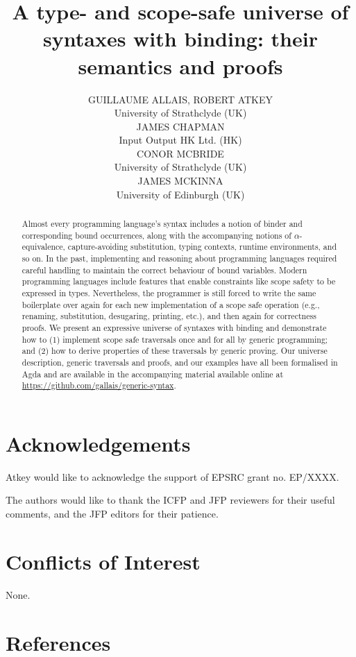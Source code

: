 \documentclass{jfp1}
\title
  [A type- and scope-safe universe of syntaxes with binding]
  {A type- and scope-safe universe of syntaxes with binding: their semantics and proofs}
\author[G. Allais et al.]
  {GUILLAUME ALLAIS, ROBERT ATKEY\\
   University of Strathclyde (UK)\\
   JAMES CHAPMAN\\
   Input Output HK Ltd. (HK)\\
   CONOR MCBRIDE\\
   University of Strathclyde (UK)\\
   JAMES MCKINNA\\
   University of Edinburgh (UK)
  }
\begin{document}
\maketitle
\begin{abstract}
Almost every programming language's syntax includes a notion of binder
and corresponding bound occurrences, along with the accompanying
notions of $\alpha$-equivalence, capture-avoiding substitution, typing
contexts, runtime environments, and so on. In the past, implementing
and reasoning about programming languages required careful handling to
maintain the correct behaviour of bound variables. Modern programming
languages include features that enable constraints like scope safety
to be expressed in types. Nevertheless, the programmer is still forced
to write the same boilerplate over again for each new implementation
of a scope safe operation (e.g., renaming, substitution, desugaring,
printing, etc.), and then again for correctness proofs.
We present an expressive universe of syntaxes with binding and
demonstrate how to (1) implement scope safe traversals once and for
all by generic programming; and (2) how to derive properties of these
traversals by generic proving. Our universe description, generic
traversals and proofs, and our examples have all been formalised in
Agda and are available in the accompanying material available online
at \url{https://github.com/gallais/generic-syntax}.
\end{abstract}




\section*{Acknowledgements}

Atkey would like to acknowledge the support of EPSRC grant no. EP/XXXX.

The authors would like to thank the ICFP and JFP reviewers for their
useful comments, and the JFP editors for their patience.

\section*{Conflicts of Interest}

None.


\renewcommand{\bibsection}{}
\section*{References}


\end{document}
